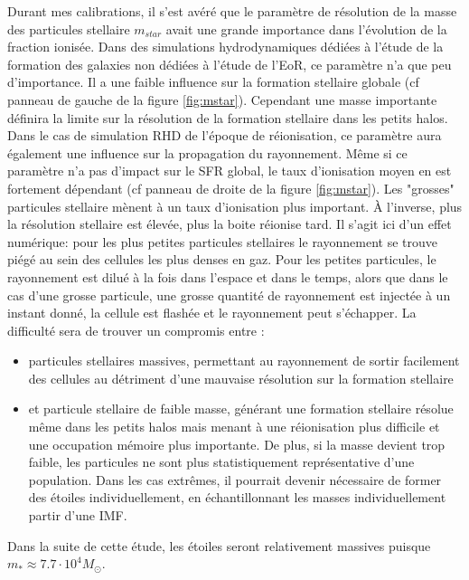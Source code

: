Durant mes calibrations, il s'est avéré que le paramètre de résolution de la masse des particules stellaire $m_{star}$ avait une grande importance dans l'évolution de la fraction ionisée.
Dans des simulations hydrodynamiques dédiées à l'étude de la formation des galaxies non dédiées à l'étude de l'\ac{EoR}, ce paramètre n'a que peu d'importance.
Il a une faible influence sur la formation stellaire globale (cf panneau de gauche de la figure \ref{fig:mstar}).
Cependant une masse importante  définira la limite sur la résolution de la formation stellaire dans les petits halos.
Dans le cas de simulation \ac{RHD} de l'époque de réionisation, ce paramètre aura également une influence sur la propagation du rayonnement.
Même si ce paramètre n'a pas d'impact sur le \ac{SFR} global, le taux d'ionisation moyen en est fortement dépendant (cf panneau de droite de la figure \ref{fig:mstar}).
Les "grosses" particules stellaire mènent à un taux d'ionisation plus important.
À l'inverse, plus la résolution stellaire est élevée, plus la boite réionise tard.
Il s'agit ici d'un effet numérique: pour les plus petites particules stellaires le rayonnement se trouve piégé au sein des cellules les plus denses en gaz.
Pour les petites particules, le rayonnement est dilué à la fois dans l'espace et dans le temps, alors que dans le cas d'une grosse particule, une grosse quantité de rayonnement est injectée à un instant donné, la cellule est flashée et le rayonnement peut s'échapper.
La difficulté sera de trouver un compromis entre :

\begin{itemize}
\item particules stellaires massives, permettant au rayonnement de sortir facilement des cellules au détriment d'une mauvaise résolution sur la formation stellaire
\item  et particule stellaire de faible masse, générant une formation stellaire résolue même dans les petits halos mais menant à une réionisation plus difficile et une occupation mémoire plus importante.
De plus, si la masse devient trop faible, les particules ne sont plus statistiquement représentative d'une population.
Dans les cas extrêmes, il pourrait devenir nécessaire de former des étoiles individuellement, en échantillonnant les masses individuellement partir d'une \ac{IMF}.
\end{itemize}

Dans la suite de cette étude, les étoiles seront relativement massives puisque $m_* \approx 7.7 \cdot 10^4 M_\odot$.


